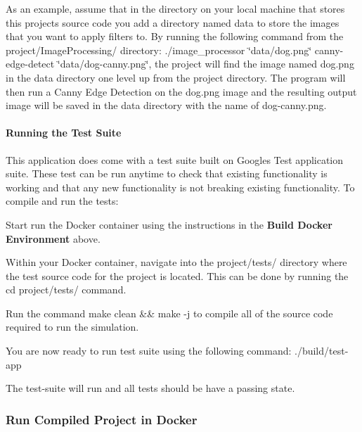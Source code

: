 As an example, assume that in the directory on your local machine that stores this project\textquotesingle{}s source code you add a directory named {\ttfamily data} to store the images that you want to apply filters to. By running the following command from the {\ttfamily project/\+Image\+Processing/} directory\+: {\ttfamily ./image\+\_\+processor \char`\"{}data/dog.\+png\char`\"{} canny-\/edge-\/detect \char`\"{}data/dog-\/canny.\+png\char`\"{}}, the project will find the image named dog.\+png in the {\ttfamily data} directory one level up from the {\ttfamily project} directory. The program will then run a Canny Edge Detection on the {\ttfamily dog.\+png} image and the resulting output image will be saved in the {\ttfamily data} directory with the name of {\ttfamily dog-\/canny.\+png}.

\paragraph*{Running the Test Suite}

This application does come with a test suite built on Google\textquotesingle{}s Test application suite. These test can be run anytime to check that existing functionality is working and that any new functionality is not breaking existing functionality. To compile and run the tests\+:
\begin{DoxyEnumerate}
\item Start run the Docker container using the instructions in the {\bfseries Build Docker Environment} above.
\item Within your Docker container, navigate into the {\ttfamily project/tests/} directory where the test source code for the project is located. This can be done by running the {\ttfamily cd project/tests/} command.
\item Run the command {\ttfamily make clean \&\& make -\/j} to compile all of the source code required to run the simulation.
\item You are now ready to run test suite using the following command\+: {\ttfamily ./build/test-\/app}
\end{DoxyEnumerate}

The test-\/suite will run and all tests should be have a passing state.

\subsubsection*{Run Compiled Project in Docker}

